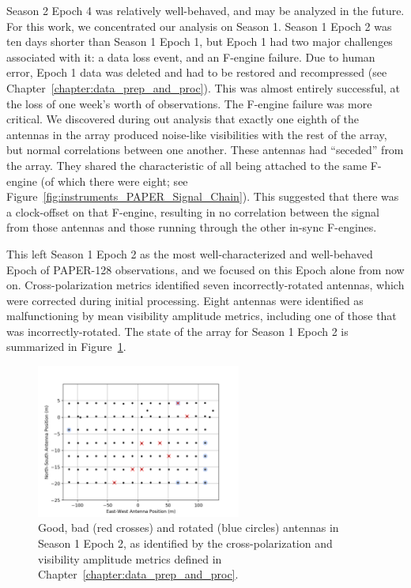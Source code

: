 Season 2 Epoch 4 was relatively well-behaved, and may be analyzed in the future. For this work, we concentrated our analysis on Season 1. Season 1 Epoch 2 was ten days shorter than Season 1 Epoch 1, but Epoch 1 had two major challenges associated with it: a data loss event, and an F-engine failure. Due to human error, Epoch 1 data was deleted and had to be restored and recompressed (see Chapter~\ref{chapter:data_prep_and_proc}). This was almost entirely successful, at the loss of one week's worth of observations. The F-engine failure was more critical. We discovered during out analysis that exactly one eighth of the antennas in the array produced noise-like visibilities with the rest of the array, but normal correlations between one another. These antennas had ``seceded'' from the array. They shared the characteristic of all being attached to the same F-engine (of which there were eight; see Figure~\ref{fig:instruments_PAPER_Signal_Chain}). This suggested that there was a clock-offset on that F-engine, resulting in no correlation between the signal from those antennas and those running through the other in-sync F-engines.

This left Season 1 Epoch 2 as the most well-characterized and well-behaved Epoch of PAPER-128 observations, and we focused on this Epoch alone from now on. Cross-polarization metrics identified seven incorrectly-rotated antennas, which were corrected during initial processing. Eight antennas were identified as malfunctioning by mean visibility amplitude metrics, including one of those that was incorrectly-rotated. The state of the array for Season 1 Epoch 2 is summarized in Figure~\ref{fig:s1e2_array}.

\begin{figure}
\centering
\includegraphics[width=0.6\textwidth]{chapters/psa128_pol/figures/s1e2_array.png}
\caption[Good, bad and rotated antennas in Season 1 Epoch 2.]{Good, bad (red crosses) and rotated (blue circles) antennas in Season 1 Epoch 2, as identified by the cross-polarization and visibility amplitude metrics defined in Chapter~\ref{chapter:data_prep_and_proc}.}
\label{fig:s1e2_array}
\end{figure}


